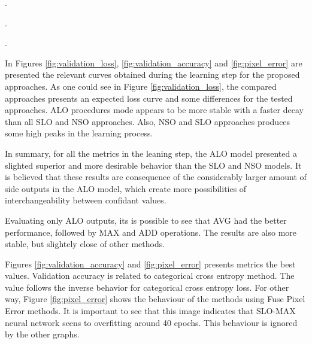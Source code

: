 {\color{red}{OLD - In Figure~2 it is presented the relevant curves obtained during the learning step for the proposed approaches. As one could see in Figure 2a, both compared approaches presents an expected loss curve and there is no significant difference between both approaches in terms of losses values, although the SLO model appears to be more stable and presents a faster decay than the ALO model}.

\color{red}{OLD - Regarding the accuracy rate, illustrated in Figure 2b, it is possible to see that the SLO model presents a better performance than the ALO model. The accuracy rate achieved by SLO was 0.974 while ALO it was 0.963 on the validation set (about 1.2\% worse). It is also possible to notice that the gap between the accuracy achieved in the training set and the accuracy achieved in validations set is smaller for the SLO model, which indicates that the ALO model is more prone to over-fit the data}. 

\color{red}{OLD - For the performance regarding time the average to process SLO model is 12.2\% smaller than the ALO network, and could process 33.60 images per second in training time, while the ALO model process 29.48 images per second}.}

In Figures \ref{fig:validation_loss}, \ref{fig:validation_accuracy} and \ref{fig:pixel_error} are presented the relevant curves obtained during the learning step for the proposed approaches. As one could see in Figure \ref{fig:validation_loss}, the compared approaches presents an expected loss curve and some differences for the tested approaches. ALO procedures mode appears to be more stable with a faster decay than all SLO and NSO approaches. Also, NSO and SLO approaches produces some high peaks in the learning process.

In summary, for all the metrics in the leaning step, the ALO model presented a slighted superior and more desirable behavior than the SLO and NSO models. It is believed that these results are consequence of the considerably larger amount of side outputs in the ALO model, which create more possibilities of interchangeability between confidant values.

Evaluating only ALO outputs, its is possible to see that AVG had the better performance, followed by MAX and ADD operations. The results are also more stable, but slightely close of other methods.

Figures \ref{fig:validation_accuracy} and \ref{fig:pixel_error} presents metrics the best values. Validation accuracy is related to categorical cross entropy method. The value follows the inverse behavior for categorical cross entropy loss. For other way, Figure \ref{fig:pixel_error} shows the behaviour of the methods using Fuse Pixel Error methods. It is important to see that this image indicates that SLO-MAX neural network seens to overfitting around 40 epochs. This behaviour is ignored by the other graphs. 

